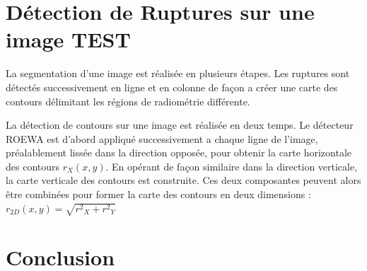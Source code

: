 \documentclass[a4paper,11pt]{article}
\begin{document}
\section{Détection de Ruptures sur une image TEST}

La segmentation d'une image est réalisée en plusieurs étapes. Les ruptures sont détectés
successivement en ligne et en colonne de façon a créer une carte des contours délimitant
les régions de radiométrie différente.

La détection de contours sur une image est réalisée en deux temps. Le détecteur
ROEWA est d'abord appliqué successivement a chaque ligne de l'image, préalablement
lissée dans la direction opposée, pour obtenir la carte horizontale des contours $r_X (x, y)$.
En opérant de façon similaire dans la direction verticale, la carte verticale des contours
est construite. Ces deux composantes peuvent alors être combinées pour former la carte
des contours en deux dimensions : $r_{2D}(x,y)=\sqrt{{r^2}_X+{r^2}_Y}$


\newpage

\section{Conclusion}
\end{document}
